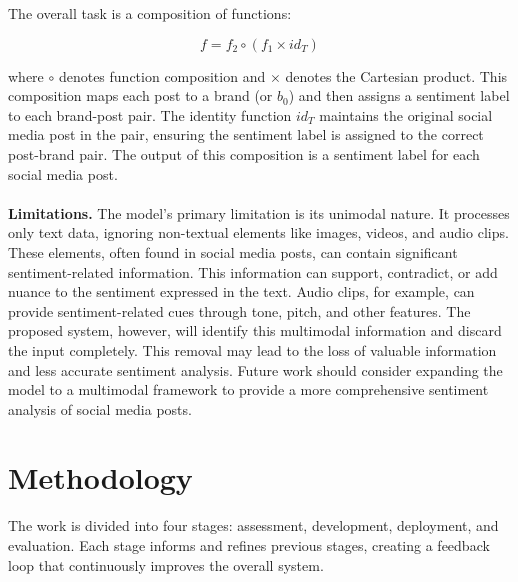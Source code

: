 \documentclass{article}
\begin{document}
The overall task is a composition of functions:

\[
    f = f_2 \circ (f_1 \times id_T)
\]

where $\circ$ denotes function composition and $\times$ denotes the Cartesian
product. This composition maps each post to a brand (or $b_0$) and then assigns
a sentiment label to each brand-post pair. The identity function $id_T$
maintains the original social media post in the pair, ensuring the sentiment
label is assigned to the correct post-brand pair. The output of this
composition is a sentiment label for each social media post.\\
\\
\textbf{Limitations.} The model's primary limitation is its unimodal nature. It
processes only text data, ignoring non-textual elements like images, videos,
and audio clips. These elements, often found in social media posts, can contain
significant sentiment-related information. This information can support,
contradict, or add nuance to the sentiment expressed in the text. Audio clips,
for example, can provide sentiment-related cues through tone, pitch, and other
features. The proposed system, however, will identify this multimodal
information and discard the input completely. This removal may lead to the loss
of valuable information and less accurate sentiment analysis. Future work
should consider expanding the model to a multimodal framework to provide a more
comprehensive sentiment analysis of social media posts.

\section{Methodology}

The work is divided into four stages: assessment, development, deployment, and
evaluation. Each stage informs and refines previous stages, creating a feedback
loop that continuously improves the overall system.
\end{document}
